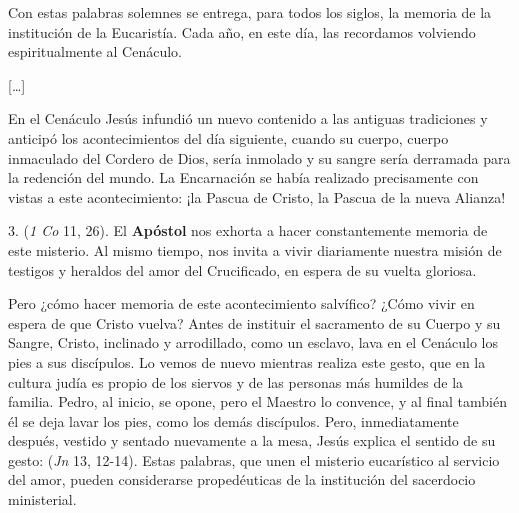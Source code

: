 \begin{body}
Con estas palabras solemnes se entrega, para todos los siglos, la memoria de la institución de la Eucaristía. Cada año, en este día, las recordamos volviendo espiritualmente al Cenáculo. 

 [\ldots]

En el Cenáculo Jesús infundió un nuevo contenido a las antiguas tradiciones y anticipó los acontecimientos del día siguiente, cuando su cuerpo, cuerpo inmaculado del Cordero de Dios, sería inmolado y su sangre sería derramada para la redención del mundo. La Encarnación se había realizado precisamente con vistas a este acontecimiento: ¡la Pascua de Cristo, la Pascua de la nueva Alianza!

3.  (\textit{1 Co} 11, 26). El \textbf{Apóstol} nos exhorta a hacer constantemente memoria de este misterio. Al mismo tiempo, nos invita a vivir diariamente nuestra misión de testigos y heraldos del amor del Crucificado, en espera de su vuelta gloriosa.

Pero ¿cómo hacer memoria de este acontecimiento salvífico? ¿Cómo vivir en espera de que Cristo vuelva? Antes de instituir el sacramento de su Cuerpo y su Sangre, Cristo, inclinado y arrodillado, como un esclavo, lava en el Cenáculo los pies a sus discípulos. Lo vemos de nuevo mientras realiza este gesto, que en la cultura judía es propio de los siervos y de las personas más humildes de la familia. Pedro, al inicio, se opone, pero el Maestro lo convence, y al final también él se deja lavar los pies, como los demás discípulos. Pero, inmediatamente después, vestido y sentado nuevamente a la mesa, Jesús explica el sentido de su gesto:  (\textit{Jn} 13, 12-14). Estas palabras, que unen el misterio eucarístico al servicio del amor, pueden considerarse propedéuticas de la institución del sacerdocio ministerial.


\end{body}
